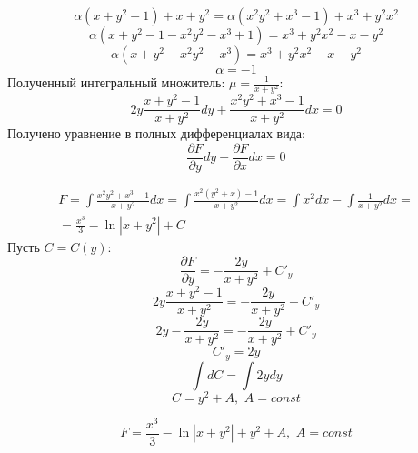 \documentclass[a5paper, 10pt]{article}
\theoremstyle{definition}
\theoremstyle{plain}
\theoremstyle{remark}
\begin{document}
\begin{equation*}
  {\alpha}(x + y^2 - 1) +x+y^2 =  {\alpha} ( x^2y^2+x^3 - 1)  +  x^3+y^2x^2
\end{equation*}
\begin{equation*}
  {\alpha}(x + y^2 - 1 - x^2y^2-x^3 + 1) =    x^3+y^2x^2 -x-y^2 
\end{equation*}
\begin{equation*}
  {\alpha}(x + y^2  - x^2y^2-x^3 ) =    x^3+y^2x^2 -x-y^2 
\end{equation*}
\begin{equation*}
  {\alpha} = -1
\end{equation*}
Полученный интегральный множитель: $\mu = \frac{1}{x+y^2}$:
\begin{equation*}
2y\frac{x + y^2 - 1}{x+y^2}dy + \frac{x^2y^2+x^3 - 1}{x+y^2} dx = 0
\end{equation*}
Получено уравнение в полных дифференциалах вида:
\begin{equation*}
\frac{\partial F}{\partial y}dy + \frac{\partial F}{\partial x}dx = 0
\end{equation*}

\begin{multline*}
F = \int \frac{x^2y^2+x^3 - 1}{x+y^2} dx = \int \frac{x^2(y^2+x) - 1}{x+y^2} dx = \int x^2 dx - \int \frac{1}{x+y^2} dx =\\
= \frac{x^3}{3} - \ln |x + y^2| + C
\end{multline*}
Пусть $C = C(y)$:
\begin{equation*}
\frac{\partial F}{\partial y} = -\frac{2y}{x + y^2} + C'_y
\end{equation*}
\begin{equation*}
2y\frac{x + y^2 - 1}{x+y^2} =  -\frac{2y}{x + y^2} + C'_y
\end{equation*}
\begin{equation*}
2y - \frac{ 2y}{x+y^2} =  -\frac{2y}{x + y^2} + C'_y
\end{equation*}
\begin{equation*}
  C'_y = 2y
\end{equation*}
\begin{equation*}
\int  dC= \int 2ydy
\end{equation*}
\begin{equation*}
  C = y^2 + A, \, \, A = const
\end{equation*}

\begin{equation*}
F = \frac{x^3}{3} - \ln |x + y^2| +  y^2 + A, \, \, A = const
\end{equation*}
\end{document}
